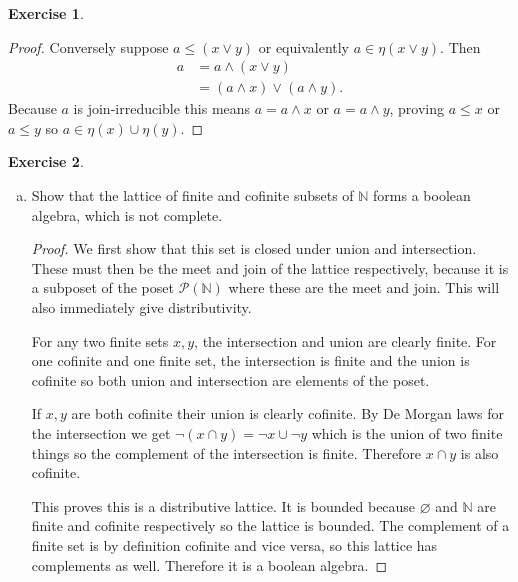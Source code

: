 \documentclass{article}
\newcommand{\N}{\mathbb{N}}
\newcommand{\powset}{\mathcal{P}}
\theoremstyle{definition}
\newtheorem{question}{Exercise}
\begin{document}
\begin{question}
\begin{enumerate}[a)]
\begin{proof}
                  Conversely suppose \(a\leq (x\vee y)\) or equivalently
                  \(a\in\eta(x\vee y)\). Then
                  \begin{align*}
                      a & =a\wedge(x\vee y)            \\
                        & =(a\wedge x)\vee(a\wedge y).
                  \end{align*}
                  Because \(a\) is join-irreducible this means \(a=a\wedge x\)
                  or \(a=a\wedge y\), proving \(a\leq x\) or \(a\leq y\) so
                  \(a\in\eta(x)\cup\eta(y)\).
              \end{proof}
    \end{enumerate}
\end{question}

\begin{question}
    \begin{enumerate}[a)]
        \item Show that the lattice of finite and cofinite subsets of \(\N\)
              forms a boolean algebra, which is not complete.

              \begin{proof}
                  We first show that this set is closed under union and
                  intersection. These must then be the meet and join of the
                  lattice respectively, because it is a subposet of the poset
                  \(\powset(\N)\) where these are the meet and join. This will
                  also immediately give distributivity.

                  For any two finite sets \(x,y\), the intersection and union
                  are clearly finite. For one cofinite and one finite set,
                  the intersection is finite and the union is cofinite so
                  both union and intersection are elements of the poset.

                  If \(x,y\) are both cofinite their union is clearly cofinite.
                  By De Morgan laws for the intersection we get \(\neg(x\cap
                  y)=\neg x\cup\neg y\) which is the union of two finite things
                  so the complement of the intersection is finite. Therefore
                  \(x\cap y\) is also cofinite.

                  This proves this is a distributive lattice. It is bounded
                  because \(\varnothing\) and \(\N\) are finite and cofinite
                  respectively so the lattice is bounded. The complement of a
                  finite set is by definition cofinite and vice versa, so this
                  lattice has complements as well. Therefore it is a boolean
                  algebra.


\end{proof}
\end{enumerate}
\end{question}
\end{document}
